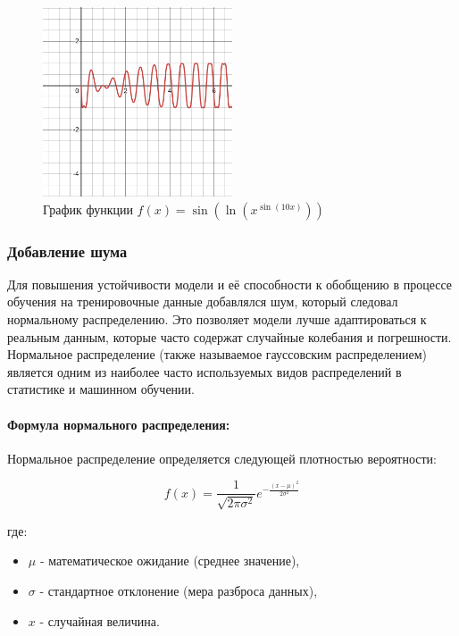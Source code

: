 \begin{figure}[H]
    \centering
    \includegraphics[width=0.5\textwidth]{figures/graph_hardsin.png}
    \caption{График функции $f(x) = \sin\left(\ln(x^{\sin(10x)})\right)$}
    \label{fig:hardsin_graph}
\end{figure}

\subsubsection{Добавление шума}

Для повышения устойчивости модели и её способности к обобщению в процессе обучения на тренировочные данные добавлялся шум, который следовал нормальному распределению. Это позволяет модели лучше адаптироваться к реальным данным, которые часто содержат случайные колебания и погрешности. Нормальное распределение (также называемое гауссовским распределением) является одним из наиболее часто используемых видов распределений в статистике и машинном обучении.

\paragraph{Формула нормального распределения:}
Нормальное распределение определяется следующей плотностью вероятности:

\[
f(x) = \frac{1}{\sqrt{2 \pi \sigma^2}} e^{-\frac{(x - \mu)^2}{2 \sigma^2}}
\]

где:
\begin{itemize}
    \item $\mu$ - математическое ожидание (среднее значение),
    \item $\sigma$ - стандартное отклонение (мера разброса данных),
    \item $x$ - случайная величина.
\end{itemize}

